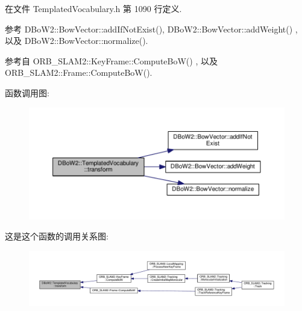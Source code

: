 在文件 Templated\-Vocabulary.\-h 第 1090 行定义.



参考 D\-Bo\-W2\-::\-Bow\-Vector\-::add\-If\-Not\-Exist(), D\-Bo\-W2\-::\-Bow\-Vector\-::add\-Weight() , 以及 D\-Bo\-W2\-::\-Bow\-Vector\-::normalize().



参考自 O\-R\-B\-\_\-\-S\-L\-A\-M2\-::\-Key\-Frame\-::\-Compute\-Bo\-W() , 以及 O\-R\-B\-\_\-\-S\-L\-A\-M2\-::\-Frame\-::\-Compute\-Bo\-W().



函数调用图\-:
\nopagebreak
\begin{figure}[H]
\begin{center}
\leavevmode
\includegraphics[width=350pt]{classDBoW2_1_1TemplatedVocabulary_af9fc1935403dcaf1fd8c44d96ae3328d_cgraph}
\end{center}
\end{figure}




这是这个函数的调用关系图\-:
\nopagebreak
\begin{figure}[H]
\begin{center}
\leavevmode
\includegraphics[width=350pt]{classDBoW2_1_1TemplatedVocabulary_af9fc1935403dcaf1fd8c44d96ae3328d_icgraph}
\end{center}
\end{figure}


